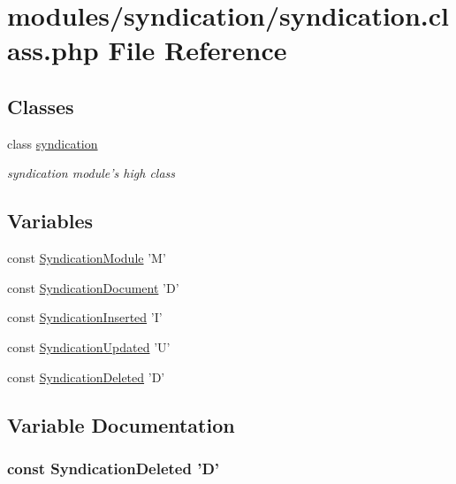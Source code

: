 \hypertarget{syndication_8class_8php}{\section{modules/syndication/syndication.class.\-php File Reference}
\label{syndication_8class_8php}
}
\subsection*{Classes}
\begin{DoxyCompactItemize}
\item 
class \hyperlink{classsyndication}{syndication}
\begin{DoxyCompactList}\small\item\em syndication module's high class \end{DoxyCompactList}\end{DoxyCompactItemize}
\subsection*{Variables}
\begin{DoxyCompactItemize}
\item 
const \hyperlink{syndication_8class_8php_a838e25d71aab91eff8acb021bf6ac29e}{Syndication\-Module} 'M'
\item 
const \hyperlink{syndication_8class_8php_a4451f4ec0ed067eff54c2401d95c6da3}{Syndication\-Document} 'D'
\item 
const \hyperlink{syndication_8class_8php_a14b98cdfd788ec2de771f809b3f903fb}{Syndication\-Inserted} 'I'
\item 
const \hyperlink{syndication_8class_8php_a97adf2fb7a5ec2007473ab1db8ca9021}{Syndication\-Updated} 'U'
\item 
const \hyperlink{syndication_8class_8php_a632320cc57269f8f514b0bf7ac383c21}{Syndication\-Deleted} 'D'
\end{DoxyCompactItemize}


\subsection{Variable Documentation}
\hypertarget{syndication_8class_8php_a632320cc57269f8f514b0bf7ac383c21}{
\subsubsection[{Syndication\-Deleted}]{\setlength{\rightskip}{0pt plus 5cm}const Syndication\-Deleted 'D'}}\label{syndication_8class_8php_a632320cc57269f8f514b0bf7ac383c21}


